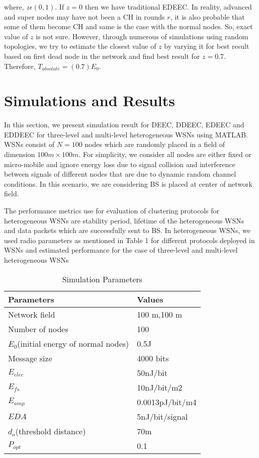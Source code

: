 \documentclass[3p,times,procedia]{elsarticle}
\begin{document}
where, $z \epsilon ({0,1})$. If $z=0$ then we have traditional EDEEC. In reality, advanced and super nodes may have not been a CH in rounds $r$, it is also probable that some of them become CH and same is the case with the normal nodes. So, exact value of $z$ is not sure. However, through numerous of simulations using random topologies, we try to estimate the closest value of $z$ by varying it for best result based on first dead node in the network and find best result for $z=0.7$. Therefore, $T_{absolute}= (0.7) E_{0}$.

\section{Simulations and Results}
In this section, we present simulation result for DEEC, DDEEC, EDEEC and EDDEEC for three-level and multi-level heterogeneous WSNs using MATLAB. WSNs consist of $N=100$ nodes which are randomly placed in a field of dimension $100m\times100m$. For simplicity, we consider all nodes are either fixed or micro-mobile and ignore energy loss due to signal collision and interference between signals of different nodes that are due to dynamic random channel conditions. In this scenario, we are considering BS is placed at center of network field.

The performance metrics use for evaluation of clustering protocols for heterogeneous WSNs are stability period, lifetime of the heterogeneous WSNs and data packets which are successfully sent to BS. In heterogeneous WSNs, we used radio parameters as mentioned in Table 1 for different protocols deployed in WSNs and estimated performance for the case of three-level and multi-level heterogeneous WSNs


\begin{table}[!h]
\caption{Simulation Parameters}
\begin{center}
    \begin{tabular}{ | p{2.5cm} | p{2.5cm} |}
    \hline
    Parameters &	Values\\ \hline
    Network field & 100 m,100 m\\ \hline
    Number of nodes	& 100\\ \hline
    $E_{0}$(initial energy of normal nodes) & 0.5J\\ \hline
    Message size &	4000 bits \\ \hline
    $E_{elec}$ & 50nJ/bit\\ \hline
    $E_{fs}$ & 10nJ/bit/m2\\ \hline
    $E_{amp}$ & 0.0013pJ/bit/m4\\ \hline
    $EDA$ & 5nJ/bit/signal\\ \hline
    $d_{o}$(threshold distance) & 70m\\ \hline
    $P_{opt}$ & 0.1 \\ \hline
\end{tabular}
\end{center}
\end{table}
\end{document}
